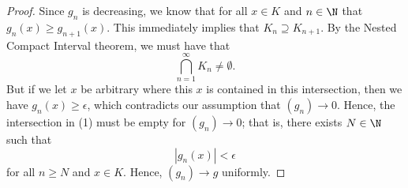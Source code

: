 \begin{enumerate}
\begin{proof}
        Since \( g_n  \) is decreasing, we know that for all \( x \in K  \) and \( n \in \N  \) that \( g_n(x) \geq g_{n+1}(x) \). This immediately implies that \( K_n \supseteq K_{n+1} \). By the Nested Compact Interval theorem, we must have that 
        \[ \bigcap_{ n=1 }^{ \infty  } K_n \neq \emptyset. \tag{1} \]
        But if we let \( x  \) be arbitrary where this \( x  \) is contained in this intersection, then we have \( g_n(x) \geq \epsilon  \), which contradicts our assumption that \( (g_n) \to 0  \). Hence, the intersection in (1) must be empty for \( (g_n) \to 0  \); that is, there exists \( N \in \N  \) such that  
        \[  | g_n(x)  | < \epsilon  \]
        for all \( n \geq N  \) and \( x \in K  \). Hence, \( (g_n) \to g  \) uniformly.
        \end{proof}
\end{enumerate}
